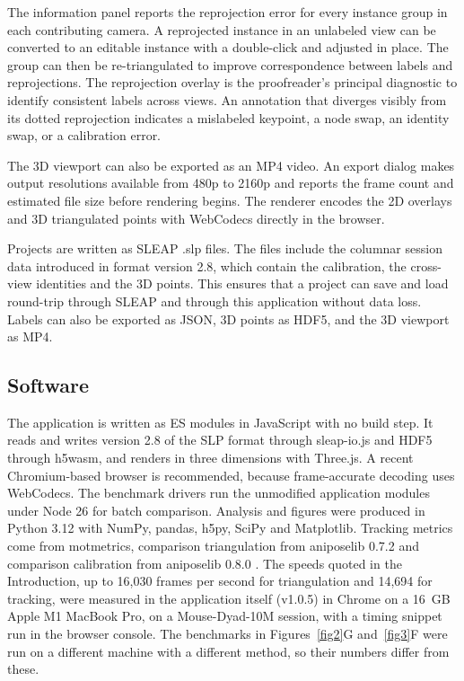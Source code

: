 \documentclass[pdflatex, sn-nature]{sn-jnl}
\theoremstyle{thmstyleone}%
\theoremstyle{thmstyletwo}%
\theoremstyle{thmstylethree}%
\begin{document}
The information panel reports the reprojection error for every instance group in each contributing camera. A reprojected instance in an unlabeled view can be converted to an editable instance with a double-click and adjusted in place. The group can then be re-triangulated to improve correspondence between labels and reprojections. The reprojection overlay is the proofreader's principal diagnostic to identify consistent labels across views. An annotation that diverges visibly from its dotted reprojection indicates a mislabeled keypoint, a node swap, an identity swap, or a calibration error. 

The 3D viewport can also be exported as an MP4 video. An export dialog makes output resolutions available from 480p to 2160p and reports the frame count and estimated file size before rendering begins. The renderer encodes the 2D overlays and 3D triangulated points with WebCodecs directly in the browser.

Projects are written as SLEAP .slp files. The files include the columnar session data introduced in format version 2.8, which contain the calibration, the cross-view identities and the 3D points. This ensures that a project can save and load round-trip through SLEAP and through this application without data loss. Labels can also be exported as JSON, 3D points as HDF5, and the 3D viewport as MP4. 

\subsection{Software}\label{methods-software}

The application is written as ES modules in JavaScript with no build step. It reads and writes version 2.8 of the SLP format through sleap-io.js and HDF5 through h5wasm, and renders in three dimensions with Three.js. A recent Chromium-based browser is recommended, because frame-accurate decoding uses WebCodecs. The benchmark drivers run the unmodified application modules under Node 26 for batch comparison. Analysis and figures were produced in Python 3.12 with NumPy, pandas, h5py, SciPy and Matplotlib. Tracking metrics come from motmetrics, comparison triangulation from aniposelib 0.7.2 and comparison calibration from aniposelib 0.8.0 \citep{Bernardin2008, Heindl2024, Karashchuk2021}. The speeds quoted in the Introduction, up to 16,030 frames per second for triangulation and 14,694 for tracking, were measured in the application itself (v1.0.5) in Chrome on a 16~GB Apple M1 MacBook Pro, on a Mouse-Dyad-10M session, with a timing snippet run in the browser console. The benchmarks in Figures~\ref{fig2}G and~\ref{fig3}F were run on a different machine with a different method, so their numbers differ from these.
\end{document}

